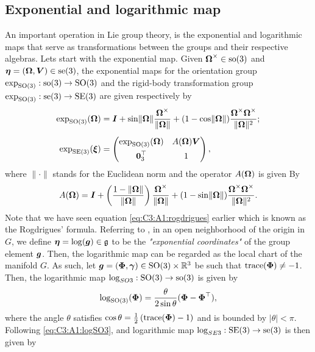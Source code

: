 \subsection{Exponential and logarithmic map}
An important operation in Lie group theory, is the exponential and logarithmic maps that serve as transformations between the groups and their respective algebras. Lets start with the exponential map. Given $\boldsymbol{\Omega}^\times\in \textup{\textrm{so}}(3)$ and ${\boldsymbol{\eta}} = (\boldsymbol{\Omega},{\boldsymbol{V}}) \in \textup{\textrm{se}}(3)$, the exponential maps for the orientation group $\exp_{\textup{\textrm{SO}}(3)}: \textup{\textrm{so}}(3) \to \textup{\textrm{SO}}(3)$ and the rigid-body transformation group $\exp_{\textup{\textrm{SO}}(3)}: \textup{\textrm{se}}(3) \to \textup{\textrm{SE}}(3)$ are given respectively by
%
\begin{align}
\exp_{\textup{\textrm{SO}}(3)}(\boldsymbol{\Omega}) & = {\boldsymbol{I}} + \sin \lVert \boldsymbol{\Omega} \rVert\frac{\boldsymbol{\Omega}^\times}{\lVert \boldsymbol{\Omega} \rVert} + (1 - \cos \lVert \boldsymbol{\Omega} \rVert) \frac{ \boldsymbol{\Omega}^\times \boldsymbol{\Omega}^\times }{\lVert \boldsymbol{\Omega} \rVert^2}; \label{eq:C3:A1:rogdrigues} \\[0.45em]
\exp_{\textup{\textrm{SE}}(3)}({\boldsymbol{\xi}}) & =
\begin{pmatrix}
\exp_{\textup{\textrm{SO}}(3)}(\boldsymbol{\Omega}) & A(\boldsymbol{\Omega}) {\boldsymbol{V}} \\[0.45em]\boldsymbol{0}_3^\top & 1
\end{pmatrix},
\end{align}
%
where $\lVert \cdot \rVert$ stands for the Euclidean norm and the operator $A(\boldsymbol{\Omega})$ is given By
%
\begin{equation}
A(\boldsymbol{\Omega}) = {\boldsymbol{I}} + \left(\frac{1 - \lVert \boldsymbol{\Omega} \rVert}{\lVert \boldsymbol{\Omega} \rVert}\right) \frac{\boldsymbol{\Omega}^\times}{\lVert \boldsymbol{\Omega} \rVert} + (1 - \sin \lVert \boldsymbol{\Omega} \rVert) \frac{ \boldsymbol{\Omega}^\times \boldsymbol{\Omega}^\times }{\lVert \boldsymbol{\Omega} \rVert^2}.
\end{equation}
%
Note that we have seen equation \eqref{eq:C3:A1:rogdrigues} earlier which is known as the Rogdrigues' formula. Referring to \cite{Bullo1995}, in an open neighborhood of the origin in $G$, we define ${\boldsymbol{\eta}} = \log({\boldsymbol{g}}) \in \mathfrak{g}$ to be the \emph{"exponential coordinates"} of the group element ${\boldsymbol{g}}$. 
Then, the logarithmic map can be regarded as the local chart of the manifold $G$. 
As such, let ${\boldsymbol{g}} = ({\boldsymbol{\Phi}}, {\boldsymbol{\gamma}}) \in \textup{\textrm{SO}}(3) \times \mathbb{R}^3$ be such that $\text{trace}({\boldsymbol{\Phi}}) \neq -1$. Then, the logarithmic map $\log_{SO{3}}: \textup{\textrm{SO}}(3) \to \textup{\textrm{so}}(3)$ is given by
%
\begin{equation}
  \log_{\textup{\textrm{SO}}(3)}({\boldsymbol{\Phi}}) = \frac{\theta}{2\sin\theta}({\boldsymbol{\Phi}} - {\boldsymbol{\Phi}}^\top), 
  \label{eq:C3:A1:logSO3} 
\end{equation}
%
where the angle $\theta$ satisfies $\cos \theta = \frac{1}{2} \left(\text{trace}({\boldsymbol{\Phi}})- 1 \right)$ and is bounded by $|\theta| < \pi$. Following \eqref{eq:C3:A1:logSO3}, and logarithmic map $\log_{SE{3}}: \textup{\textrm{SE}}(3) \to \textup{\textrm{se}}(3)$ is then given by
